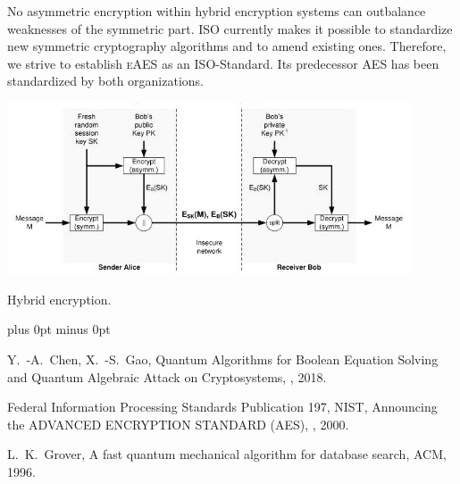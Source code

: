 \documentclass[a4paper,11pt]{article}
\begin{document}
\begin{otherlanguage}{english}
\noindent
No asymmetric encryption within hybrid encryption systems can outbalance weaknesses of the symmetric part. ISO currently makes it possible to standardize new symmetric cryptography algorithms and to amend existing ones. Therefore, we strive to establish \textsc{eAES} as an ISO-Standard. Its predecessor \textsc{AES} has been standardized by both organizations. \\

\begin{figurehere}
  \centering
  \includegraphics[width=12cm]{hybrid-encryption.jpg}
  \caption{Hybrid encryption.\label{abb_2}}
\end{figurehere}

\vspace{0.3cm} 






\begin{thebibliography}{1}
\itemsep=0cm plus 0pt minus 0pt

Y.~-A.~Chen, X.~-S.~Gao,
  \newblock Quantum Algorithms for Boolean Equation Solving and Quantum Algebraic Attack on Cryptosystems,
  , 2018.

Federal Information Processing Standards Publication 197, NIST,
  \newblock Announcing the ADVANCED ENCRYPTION STANDARD (AES),
  , 2000.

L.~K.~Grover,
  \newblock A fast quantum mechanical algorithm for database search, 
   ACM, 1996.


\end{thebibliography}
\end{otherlanguage}
\end{document}
